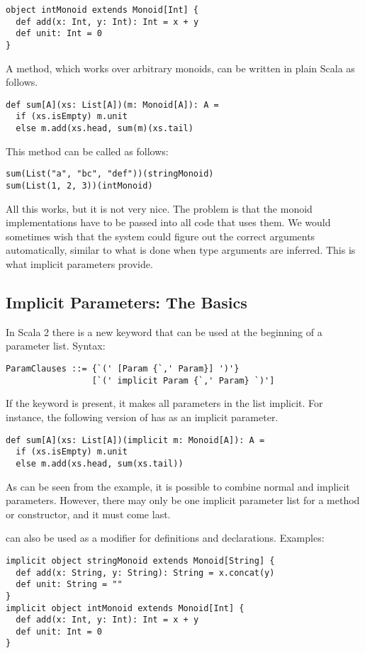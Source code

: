 {\begin{lstlisting}
object intMonoid extends Monoid[Int] {
  def add(x: Int, y: Int): Int = x + y
  def unit: Int = 0
}
\end{lstlisting}
A \lstinline@sum@ method, which works over arbitrary
monoids, can be written in plain Scala as follows.
\begin{lstlisting}
def sum[A](xs: List[A])(m: Monoid[A]): A =
  if (xs.isEmpty) m.unit
  else m.add(xs.head, sum(m)(xs.tail)
\end{lstlisting}
This \lstinline@sum@ method can be called as follows:
\begin{lstlisting}
sum(List("a", "bc", "def"))(stringMonoid)
sum(List(1, 2, 3))(intMonoid)
\end{lstlisting}
All this works, but it is not very nice. The problem is that the
monoid implementations have to be passed into all code that uses them.
We would sometimes wish that the system could figure out the correct
arguments automatically, similar to what is done when type arguments
are inferred. This is what implicit parameters provide.

\subsection*{Implicit Parameters: The Basics}

In Scala 2 there is a new \lstinline@implicit@ keyword that can be
used at the beginning of a parameter list. Syntax:
\begin{lstlisting}
ParamClauses ::= {`(' [Param {`,' Param}] ')'} 
                 [`(' implicit Param {`,' Param} `)']
\end{lstlisting}
If the keyword is present, it makes all parameters in the list
implicit.  
For instance, the following version of \lstinline@sum@ has
\lstinline@m@ as an implicit parameter.
\begin{lstlisting}
def sum[A](xs: List[A])(implicit m: Monoid[A]): A =
  if (xs.isEmpty) m.unit
  else m.add(xs.head, sum(xs.tail))
\end{lstlisting}
As can be seen from the example, it is possible to combine normal and
implicit parameters. However, there may only be one implicit parameter
list for a method or constructor, and it must come last.

\lstinline@implicit@ can also be used as a modifier for definitions
and declarations. Examples:

\begin{lstlisting}
implicit object stringMonoid extends Monoid[String] {
  def add(x: String, y: String): String = x.concat(y)
  def unit: String = ""
}
implicit object intMonoid extends Monoid[Int] {
  def add(x: Int, y: Int): Int = x + y
  def unit: Int = 0
}
\end{lstlisting}

}
